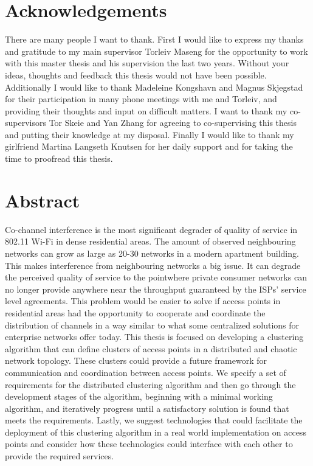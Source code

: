 \chapter*{Acknowledgements}
There are many people I want to thank.\newline
First I would like to express my thanks and gratitude to my main supervisor Torleiv Maseng for the opportunity to work with this master thesis and his supervision the last two years. Without
your ideas, thoughts and feedback this thesis would not have been possible. \newline
Additionally I would like to thank Madeleine Kongshavn and Magnus Skjegstad for their participation in many phone meetings with me and Torleiv, and providing their thoughts and
input on difficult matters. \newline
I want to thank my co-supervisors Tor Skeie and Yan Zhang for agreeing to co-supervising this thesis and putting their knowledge at my disposal. 
\newline
Finally I would like to thank my girlfriend Martina Langseth Knutsen for her daily support and for taking the time to proofread this thesis.

\clearpage

\newpage\null \thispagestyle {plain}



\chapter*{Abstract}
Co-channel interference is the most significant degrader of quality of service in 802.11 Wi-Fi in dense residential areas.
The amount of observed neighbouring networks can grow as large as 20-30 networks in a modern apartment building. This makes
interference from neighbouring networks a big issue. It can degrade the perceived quality of service to the pointwhere private consumer networks can no longer provide
anywhere near the throughput guaranteed by the ISPs' service level agreements. This problem would be easier to solve if access points in residential areas had the
opportunity to cooperate and coordinate the distribution of channels in a way similar to what some centralized solutions for enterprise networks offer today.
This thesis is focused on developing a clustering algorithm that can define clusters of access points in a distributed and chaotic network topology. These clusters could 
provide a future framework for communication and coordination between access points.
We specify a set of requirements for the distributed clustering algorithm and then go through the development stages of the algorithm,
beginning with a minimal working algorithm, and iteratively progress until a satisfactory solution is found that meets the requirements.
Lastly, we suggest technologies that could facilitate the deployment of this clustering algorithm in a real world implementation on access points and consider
how these technologies could interface with each other to provide the required services.
\clearpage

\newpage\null \thispagestyle {plain}
